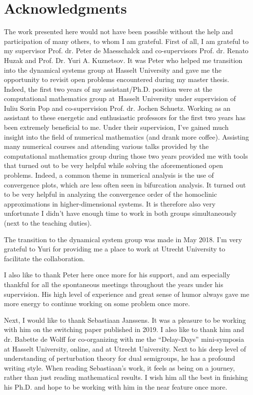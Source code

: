 \section{Acknowledgments}
The work presented here would not have been possible without the help and
participation of many others, to whom I am grateful. First of all, I am grateful
to my supervisor Prof. dr. Peter de Maesschalck and co-supervisors Prof. dr.
Renato Huzak and Prof. Dr. Yuri A. Kuznetsov. It was Peter who helped me
transition into the dynamical systems group at Hasselt University and gave me the
opportunity to revisit open problems encountered during my master thesis. Indeed,
the first two years of my assistant/Ph.D. position were at the computational
mathematics group at Hasselt University under supervision of Iuliu Sorin Pop and
co-supervision Prof. dr. Jochen Schuetz. Working as an assistant to these
energetic and enthusiastic professors for the first two years has been extremely
beneficial to me. Under their supervision, I've gained much insight into the field
of numerical mathematics (and drank more coffee). Assisting many numerical
courses and attending various talks provided by the computational mathematics
group during those two years provided me with tools that turned out to be very
helpful while solving the aforementioned open problems. Indeed, a common theme in
numerical analysis is the use of convergence plots, which are less often seen in
bifurcation analysis. It turned out to be very helpful in analyzing the
convergence order of the homoclinic approximations in higher-dimensional systems.
It is therefore also very unfortunate I didn't have enough time to work in both
groups simultaneously (next to the teaching duties).

The transition to the dynamical system group was made in May 2018. I'm very
grateful to Yuri for providing me a place to work at Utrecht University to
facilitate the collaboration.

I also like to thank Peter here once more for his support, and am especially
thankful for all the spontaneous meetings throughout the years under his
supervision. His high level of experience and great sense of humor always gave me
more energy to continue working on some problem once more.

Next, I would like to thank Sebastiaan Janssens. It was a pleasure to be working
with him on the switching paper published in 2019. I also like to thank him and
dr. Babette de Wolff for co-organizing with me the ``Delay-Days'' mini-symposia
at Hasselt University, online, and at Utrecht University. Next to his deep level
of understanding of perturbation theory for dual semigroups, he has a profound
writing style. When reading Sebastiaan's work, it feels as being on a journey,
rather than just reading mathematical results. I wish him all the best in
finishing his Ph.D. and hope to be working with him in the near feature once
more.

